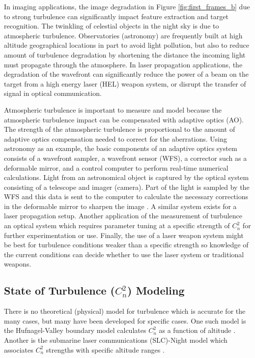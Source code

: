 In imaging applications, the image degradation in Figure \ref{fig:first_frames_b} due to strong turbulence can significantly impact feature extraction and target recognition. The twinkling of celestial objects in the night sky is due to atmospheric turbulence. Observatories (astronomy) are frequently built at high altitude geographical locations in part to avoid light pollution, but also to reduce amount of turbulence degradation by shortening the distance the incoming light must propagate through the atmosphere. In laser propagation applications, the degradation of the wavefront can significantly reduce the power of a beam on the target from a high energy laser (HEL) weapon system, or disrupt the transfer of signal in optical communication.

Atmospheric turbulence is important to measure and model because the atmospheric turbulence impact can be compensated with adaptive optics (AO). The strength of the atmospheric turbulence is proportional to the amount of adaptive optics compensation needed to correct for the aberrations. Using astronomy as an example, the basic components of an adaptive optics system consists of a wavefront sampler, a wavefront sensor (WFS), a corrector such as a deformable mirror, and a control computer to perform real-time numerical calculations. Light from an astronomical object is captured by the optical system consisting of a telescope and imager (camera). Part of the light is sampled by the WFS and this data is sent to the computer to calculate the necessary corrections in the deformable mirror to sharpen the image \cite{tyson2011principles}. A similar system exists for a laser propagation setup. Another application of the measurement of turbulence an optical system which requires parameter tuning at a specific strength of $C_{n}^{2}$ for further experimentation or use. Finally, the use of a laser weapon system might be best for turbulence conditions weaker than a specific strength so knowledge of the current conditions can decide whether to use the laser system or traditional weapons.

\subsection{State of Turbulence ($C_{n}^{2}$) Modeling}
There is no theoretical (physical) model for turbulence which is accurate for the many cases, but many have been developed for specific cases. One such model is the Hufnagel-Valley boundary model calculates $C_{n}^{2}$ as a function of altitude \cite{Valley:80}. Another is the submarine laser communications (SLC)-Night model which associates $C_{n}^{2}$ strengths with specific altitude ranges \cite{tyson2011principles}.

